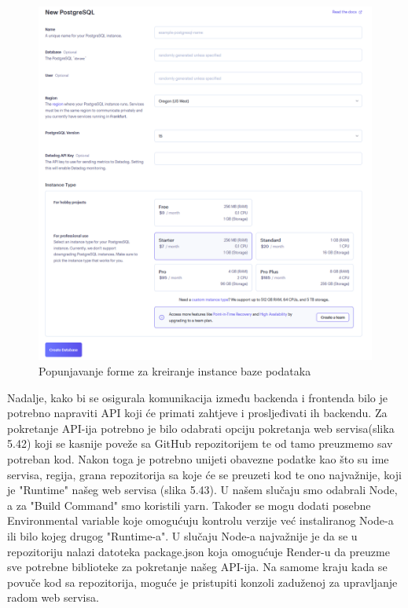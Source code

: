 				\begin{figure}[H]
					\centering
					\includegraphics[width=\textwidth]{slike/create_db_form.png}
					\caption{Popunjavanje forme za kreiranje instance baze podataka}
					\label{fig: Render create new DB}
				\end{figure}
				Nadalje, kako bi se osigurala komunikacija između backenda i frontenda bilo je potrebno napraviti API koji će primati zahtjeve i prosljeđivati ih backendu. Za pokretanje API-ija potrebno je bilo odabrati opciju pokretanja web servisa(slika 5.42) koji se kasnije poveže sa GitHub repozitorijem te od tamo preuzmemo sav potreban kod.
				Nakon toga je potrebno unijeti obavezne podatke kao što su ime servisa, regija, grana repozitorija sa koje će se preuzeti kod te ono najvažnije, koji je "Runtime" našeg web servisa (slika 5.43). U našem slučaju smo odabrali Node, a za "Build Command" smo koristili yarn. Također se mogu dodati posebne Environmental variable koje omogućuju kontrolu verzije već instaliranog Node-a ili bilo kojeg drugog "Runtime-a". U slučaju Node-a najvažnije je da se u repozitoriju nalazi datoteka package.json koja omogućuje Render-u da preuzme sve potrebne biblioteke za pokretanje našeg API-ija.
				Na samome kraju kada se povuče kod sa repozitorija, moguće je pristupiti konzoli zaduženoj za upravljanje radom web servisa.
